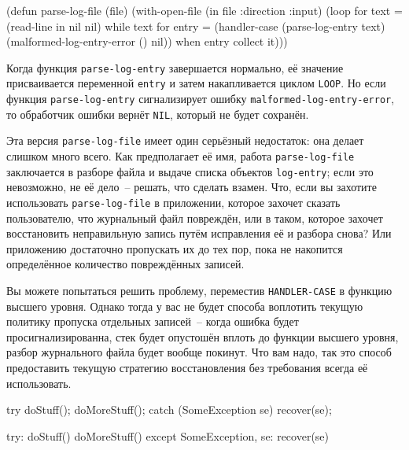 \begin{myverb}
(defun parse-log-file (file)
  (with-open-file (in file :direction :input)
    (loop for text = (read-line in nil nil) while text
       for entry = (handler-case (parse-log-entry text)
                     (malformed-log-entry-error () nil))
       when entry collect it)))
\end{myverb}

Когда функция \lstinline{parse-log-entry} завершается нормально, её значение присваивается
переменной \lstinline{entry} и затем накапливается циклом \lstinline{LOOP}. Но если функция
\lstinline{parse-log-entry} сигнализирует ошибку \lstinline{malformed-log-entry-error}, то
обработчик ошибки вернёт \lstinline{NIL}, который не будет сохранён.

Эта версия \lstinline{parse-log-file} имеет один серьёзный недостаток: она делает слишком много
всего. Как предполагает её имя, работа \lstinline{parse-log-file} заключается в разборе файла и
выдаче списка объектов \lstinline{log-entry}; если это невозможно, не её дело~-- решать, что
сделать взамен. Что, если вы захотите использовать \lstinline{parse-log-file} в приложении,
которое захочет сказать пользователю, что журнальный файл повреждён, или в таком, которое
захочет восстановить неправильную запись путём исправления её и разбора снова? Или
приложению достаточно пропускать их до тех пор, пока не накопится определённое количество
повреждённых записей.

Вы можете попытаться решить проблему, переместив \lstinline{HANDLER-CASE} в функцию высшего
уровня. Однако тогда у вас не будет способа воплотить текущую политику пропуска отдельных
записей~-- когда ошибка будет просигнализированна, стек будет опустошён вплоть до функции
высшего уровня, разбор журнального файла будет вообще покинут. Что вам надо, так это
способ предоставить текущую стратегию восстановления без требования всегда её
использовать.

\begin{lrbox}{\chonenineone}
  \begin{minipage}{\linewidth}
\begin{myverb}
try {
  doStuff();
  doMoreStuff();
} catch (SomeException se) {
  recover(se);
}
\end{myverb} 
  \end{minipage}
\end{lrbox}

\begin{lrbox}{\choneninetwo}
  \begin{minipage}{\linewidth}
\begin{myverb}
try:
  doStuff()
  doMoreStuff()
except SomeException, se:
  recover(se)
\end{myverb} 
  \end{minipage}
\end{lrbox}

